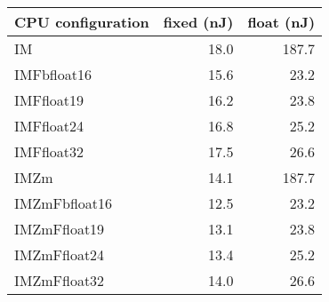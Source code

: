 \begin{tabular}{lrr}
\toprule
\bfseries{CPU configuration} & \bfseries{fixed (nJ)} & \bfseries{float (nJ)} \\
\midrule
                          IM &                  18.0 &                 187.7 \\
                 IMFbfloat16 &                  15.6 &                  23.2 \\
                  IMFfloat19 &                  16.2 &                  23.8 \\
                  IMFfloat24 &                  16.8 &                  25.2 \\
                  IMFfloat32 &                  17.5 &                  26.6 \\
                        IMZm &                  14.1 &                 187.7 \\
               IMZmFbfloat16 &                  12.5 &                  23.2 \\
                IMZmFfloat19 &                  13.1 &                  23.8 \\
                IMZmFfloat24 &                  13.4 &                  25.2 \\
                IMZmFfloat32 &                  14.0 &                  26.6 \\
\bottomrule
\end{tabular}
